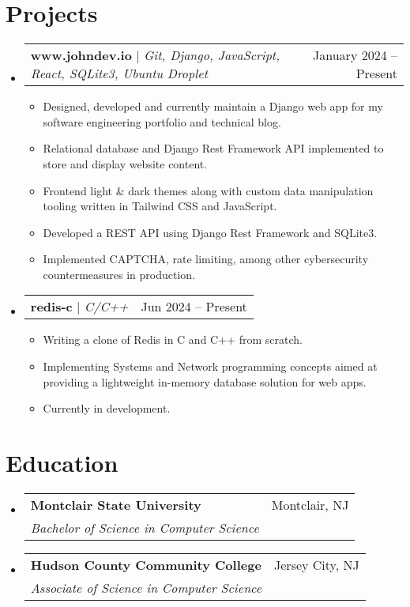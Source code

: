 \documentclass[letterpaper,11pt]{article}
\makeatletter
\newcommand{\resumeItem}[1]{
  \item\small{
    {#1 \vspace{-2pt}}
  }
}
\newcommand{\resumeSubheading}[4]{
  \vspace{-2pt}\item
    \begin{tabular*}{0.97\textwidth}[t]{l@{\extracolsep{\fill}}r}
      \textbf{#1} & #2 \\
      \textit{\small#3} & \textit{\small #4} \\
    \end{tabular*}\vspace{-7pt}
}
\newcommand{\resumeProjectHeading}[2]{
    \item
    \begin{tabular*}{0.97\textwidth}{l@{\extracolsep{\fill}}r}
      \small#1 & #2 \\
    \end{tabular*}\vspace{-7pt}
}
\newcommand{\resumeSubHeadingListStart}{\begin{itemize}[leftmargin=0.15in, label={}]}
\newcommand{\resumeSubHeadingListEnd}{\end{itemize}}
\newcommand{\resumeItemListStart}{\begin{itemize}}
\newcommand{\resumeItemListEnd}{\end{itemize}\vspace{-5pt}}
\makeatother
\begin{document}
\section{Projects}
    \resumeSubHeadingListStart
      \resumeProjectHeading
            {\textbf{www.johndev.io} $|$ \emph{Git, Django, JavaScript, React, SQLite3, Ubuntu Droplet}}{January 2024 -- Present}
            \resumeItemListStart
            \resumeItem{Designed, developed and currently maintain a Django web app for my software engineering portfolio and technical blog.}
            \resumeItem{Relational database and Django Rest Framework API implemented to store and display website content.}
            \resumeItem{Frontend light \& dark themes along with custom data manipulation tooling written in Tailwind CSS and JavaScript.}
            \resumeItem{Developed a REST API using Django Rest Framework and SQLite3.}
            \resumeItem{Implemented CAPTCHA, rate limiting, among other cybersecurity countermeasures in production.}
          \resumeItemListEnd
        \resumeProjectHeading
          {\textbf{redis-c} $|$ \emph{C/C++}}{Jun 2024 -- Present}
          \resumeItemListStart
            \resumeItem{Writing a clone of Redis in C and C++ from scratch.}
            \resumeItem{Implementing Systems and Network programming concepts aimed at providing a lightweight in-memory database solution for web apps.}
            \resumeItem{Currently in development.}
          \resumeItemListEnd
    \resumeSubHeadingListEnd

\section{Education}
  \resumeSubHeadingListStart
    \resumeSubheading
      {Montclair State University}{Montclair, NJ}
      {Bachelor of Science in Computer Science}{}
    \resumeSubheading
      {Hudson County Community College}{Jersey City, NJ}
      {Associate of Science in Computer Science}{}
  \resumeSubHeadingListEnd

    
\end{document}
